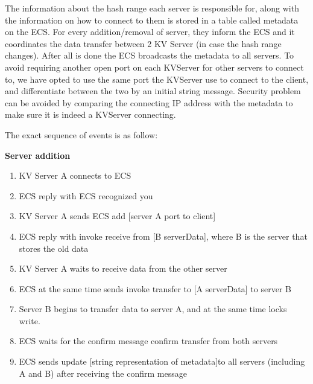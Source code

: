 \documentclass[sigconf]{acmart}
\begin{document}
The information about the hash range each server is responsible for, along with the information on how to connect to them is stored in a table called metadata on the ECS. For every addition/removal of server, they inform the ECS and it coordinates the data transfer between 2 KV Server (in case the hash range changes). After all is done the ECS broadcasts the metadata to all servers. To avoid requiring another open port on each KVServer for other servers to connect to, we have opted to use the same port the KVServer use to connect to the client, and differentiate between the two by an initial string message. Security problem can be avoided by comparing the connecting IP address with the metadata to make sure it is indeed a KVServer connecting. 

The exact sequence of events is as follow:


\textbf{Server addition}
\begin{enumerate}
	\item {KV Server A connects to ECS}
	\item {ECS reply with \colorbox{blue!30}{ECS recognized you}}
	\item {KV Server A sends \colorbox{blue!30}{ECS add [server A port to client]}}
	\item {ECS reply with \colorbox{blue!30}{invoke receive from [B serverData]}, where B is the server that stores the old data}
	\item {KV Server A waits to receive data from the other server}
	\item {ECS at the same time sends \colorbox{blue!30}{invoke transfer to [A serverData]} to server B}
	\item {Server B begins to transfer data to server A, and at the same time locks write.}
	\item {ECS waits for the confirm message \colorbox{blue!30}{confirm transfer} from both servers}
	\item {ECS sends \colorbox{blue!30}{update [string representation of metadata]}to all servers (including A and B) after receiving the confirm message}
\end{enumerate}
\end{document}
